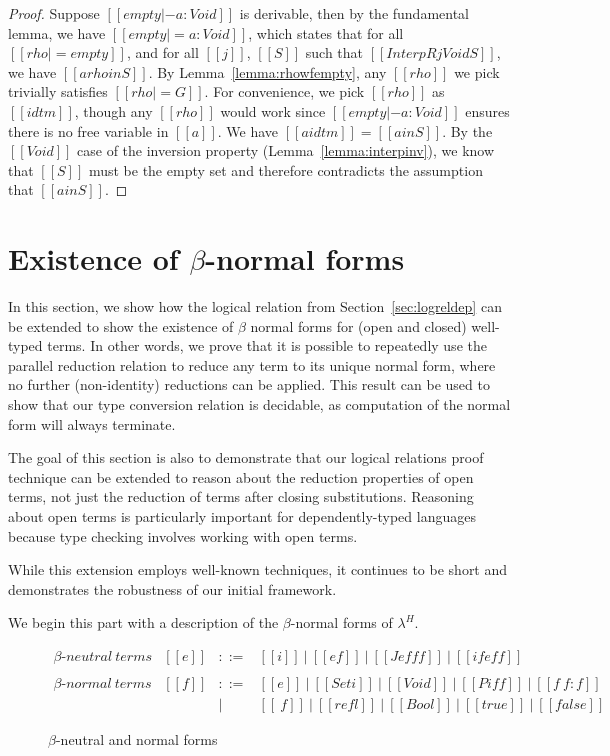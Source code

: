 \documentclass[acmsmall,screen=true,
\ifpublic review=false\else,review=true\fi
  ,anonymous=\ifanonymous true\else false\fi]{acmart}
\newcommand{\lang}{$\lambda^H$\xspace}
\newcommand{\scw}[1]{}
\begin{document}
\begin{proof}
  Suppose $[[empty |- a : Void]]$ is derivable, then by the
  fundamental lemma, we have $[[empty |= a : Void]]$, which states
  that for all $[[rho |= empty]]$, and for all $[[j]]$, $[[S]]$ such
  that $[[InterpR j Void S]]$, we have $[[a {rho} in S]]$. By
  Lemma~\ref{lemma:rhowfempty}, any $[[rho]]$ we pick trivially
  satisfies $[[rho |= G]]$. For convenience, we pick $[[rho]]$ as
  $[[idtm]]$, though any $[[rho]]$ would work since
  $[[empty |- a : Void]]$ ensures there is no free variable in
  $[[a]]$. We have $[[a {idtm}]] = [[a in S]]$. By the $[[Void]]$
  case of the inversion property (Lemma~\ref{lemma:interpinv}), we
  know that $[[S]]$ must be the empty set and therefore contradicts
  the assumption that $[[a in S]]$.
\end{proof}


\section{Existence of $\beta$-normal forms}
\label{sec:extension}
In this section, we show how the logical relation from
Section~\ref{sec:logreldep} can be extended to show the existence of $\beta$
normal forms for (open and closed) well-typed terms.  In other words, we prove
that it is possible to repeatedly use the parallel reduction relation to
reduce any term to its unique normal form, where no further (non-identity)
reductions can be applied. This result can be used to show that our type
conversion relation is decidable, as computation of the normal form will
always terminate.

The goal of this section is also to demonstrate that our logical relations
proof technique can be extended to reason about the reduction properties of
open terms, not just the reduction of terms after closing substitutions.
Reasoning about open terms is particularly important for dependently-typed
languages because type checking involves working with open terms.
\scw{
  Add when we can find a reference:
  However, even non dependently-typed languages employ such techniques,
  especially in the case of relational semantics.
}
While this extension employs well-known techniques, it continues to be short and
demonstrates the robustness of our initial framework.

We begin this part with a description of the $\beta$-normal forms
of \lang{}.

\begin{figure}[h]
  \[
    \begin{array}{llcl}
       \beta\text{-}\mathit{neutral\ terms} &
      [[e]] & ::= & [[i]]\ |\ [[e f]]\ |\ [[J e f f f]]\ |\ [[if e f
                    f]] \\ \\
      \beta\text{-}\mathit{normal\ terms} &
      [[f]] & ::= & [[e]]\ |\ [[Set i]]\ |\ [[Void]]\ |\ [[Pi f f]]\
                    |\ [[f ~ f : f]]\\
            & & |   & [[\ f]]\ |\ [[refl]]\ |\ [[Bool]]\ |\ [[true]]\ |\ [[false]]
    \end{array}
  \]
  \caption{$\beta$-neutral and normal forms}
  \label{fig:nenf}
\end{figure}
\end{document}
